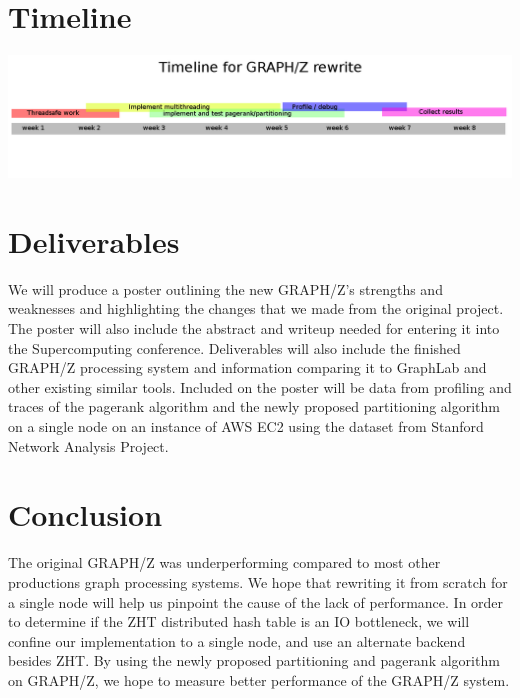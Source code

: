 \documentclass[10pt]{article}
\begin{document}
  \section{Timeline}
  \includegraphics[width=\textwidth]{timeline.png}
\begin{multicols}{2}
  \section{Deliverables}
  We will produce a poster outlining the new GRAPH/Z's strengths and weaknesses and highlighting the changes that we made from the original project. The poster will also include the abstract and writeup needed for entering it into the Supercomputing conference.  Deliverables will also include the finished GRAPH/Z processing system and information comparing it to GraphLab and other existing similar tools. Included on the poster will be data from profiling and traces of the pagerank algorithm and the newly proposed partitioning algorithm on a single node on an instance of AWS EC2 using the dataset from Stanford Network Analysis Project.
  
   \section{Conclusion}
   The original GRAPH/Z was underperforming compared to most other productions graph processing systems. We hope that rewriting it from scratch for a single node will help us pinpoint the cause of the lack of performance. In order to determine if the ZHT distributed hash table is an IO bottleneck, we will confine our implementation to a single node, and use an alternate backend besides ZHT. By using the newly proposed partitioning and pagerank algorithm on GRAPH/Z, we hope to measure better performance of the GRAPH/Z system.
   
   
\end{multicols}
\end{document}
